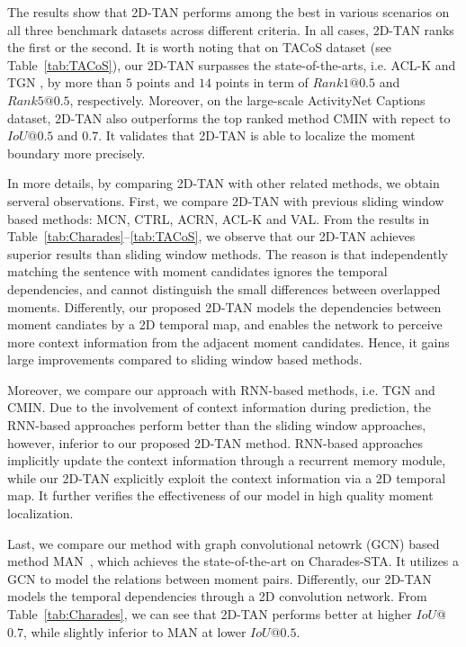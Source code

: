 \documentclass[letterpaper]{article} %
\begin{document}
The results show that 2D-TAN performs among the best in various scenarios on all three benchmark datasets across different criteria. In all cases, 2D-TAN ranks the first or the second. It is worth noting that on TACoS dataset (see Table~\ref{tab:TACoS}), our 2D-TAN surpasses the state-of-the-arts, i.e. ACL-K %
and TGN%
, by more than $5$ points and $14$ points in term of $Rank1@0.5$ and $Rank5@0.5$, respectively. Moreover, on the large-scale ActivityNet Captions dataset, 2D-TAN also outperforms the top ranked method CMIN with repect to $IoU@0.5$ and $0.7$. It validates that 2D-TAN is able to localize the moment boundary more precisely.


In more details, by comparing 2D-TAN with other related methods, we obtain serveral observations.
First, we compare 2D-TAN with previous sliding window based methods: MCN, CTRL, ACRN, ACL-K and VAL.
From the results in Table~\ref{tab:Charades}--\ref{tab:TACoS}, we observe that 
our 2D-TAN achieves superior results than sliding window methods. The reason is that independently matching the sentence with moment candidates ignores the temporal dependencies, and cannot distinguish the small differences between overlapped moments.
Differently, our proposed 2D-TAN models the dependencies between moment candiates by a 2D temporal map, and enables the network to perceive more context information from the adjacent moment candidates. Hence, it gains large improvements compared to sliding window based methods.

Moreover, we compare our approach with RNN-based methods, i.e. TGN and CMIN. 
Due to the involvement of context information during prediction, the RNN-based approaches perform better than the sliding window approaches, however, inferior to our proposed 2D-TAN method. 
RNN-based approaches implicitly update the context information through a recurrent memory module, while our 2D-TAN explicitly exploit the context information via a 2D temporal map. 
It further verifies the effectiveness of our model in high quality moment localization.

Last, we compare our method with graph convolutional netowrk (GCN) based method MAN~\cite{zhang2019man}, which achieves the state-of-the-art on Charades-STA. It utilizes a GCN to model the relations between moment pairs. Differently, our 2D-TAN models the temporal dependencies through a 2D convolution network.
From Table~\ref{tab:Charades}, we can see that 2D-TAN performs better at higher $IoU$@$0.7$, while slightly inferior to MAN at lower $IoU$@$0.5$.
\end{document}
